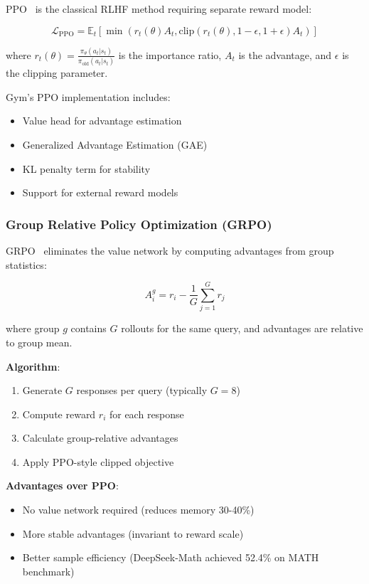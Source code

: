 \documentclass[11pt,letterpaper]{article}
\begin{document}
PPO~\citep{schulman2017ppo} is the classical RLHF method requiring separate reward model:

\begin{equation}
\mathcal{L}_{\text{PPO}} = \mathbb{E}_t \left[ \min(r_t(\theta) A_t, \text{clip}(r_t(\theta), 1-\epsilon, 1+\epsilon) A_t) \right]
\end{equation}

where $r_t(\theta) = \frac{\pi_\theta(a_t|s_t)}{\pi_{\text{old}}(a_t|s_t)}$ is the importance ratio, $A_t$ is the advantage, and $\epsilon$ is the clipping parameter.

Gym's PPO implementation includes:
\begin{itemize}
\item Value head for advantage estimation
\item Generalized Advantage Estimation (GAE)
\item KL penalty term for stability
\item Support for external reward models
\end{itemize}

\subsubsection{Group Relative Policy Optimization (GRPO)}

GRPO~\citep{shao2024deepseekmath} eliminates the value network by computing advantages from group statistics:

\begin{equation}
A_i^g = r_i - \frac{1}{G} \sum_{j=1}^G r_j
\end{equation}

where group $g$ contains $G$ rollouts for the same query, and advantages are relative to group mean.

\textbf{Algorithm}:
\begin{enumerate}
\item Generate $G$ responses per query (typically $G=8$)
\item Compute reward $r_i$ for each response
\item Calculate group-relative advantages
\item Apply PPO-style clipped objective
\end{enumerate}

\textbf{Advantages over PPO}:
\begin{itemize}
\item No value network required (reduces memory 30-40\%)
\item More stable advantages (invariant to reward scale)
\item Better sample efficiency (DeepSeek-Math achieved 52.4\% on MATH benchmark)
\end{itemize}
\end{document}

